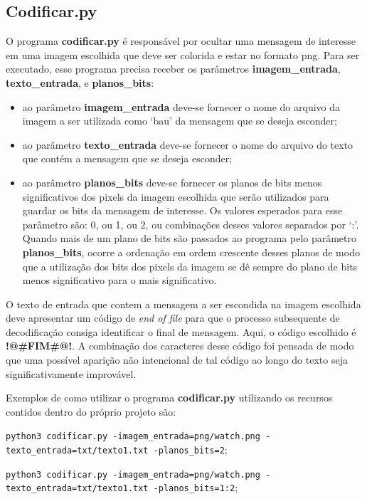 \documentclass{article}
\begin{document}
%
\subsection{Codificar.py}
O programa \textbf{codificar.py} é responsável por ocultar uma mensagem de interesse em uma imagem escolhida que deve ser colorida e estar no formato png. Para ser executado, esse programa precisa receber os parâmetros \textbf{imagem\_entrada}, \textbf{texto\_entrada}, e \textbf{planos\_bits}:

\begin{itemize}
	\item ao parâmetro \textbf{imagem\_entrada} deve-se fornecer o nome do arquivo da imagem a ser utilizada como `bau' da mensagem que se deseja esconder;
	\item ao parâmetro \textbf{texto\_entrada} deve-se fornecer o nome do arquivo do texto que contém a mensagem que
	se deseja esconder;
	\item ao parâmetro \textbf{planos\_bits} deve-se fornecer os planos de bits menos significativos dos pixels da imagem escolhida que serão utilizados para guardar os bits da mensagem de interesse. Os valores esperados para esse parâmetro são: 0, ou 1, ou 2, ou combinações desses valores separados por ‘:’. Quando mais de um plano de bits são passados ao programa pelo parâmetro \textbf{planos\_bits}, ocorre a ordenação em ordem crescente desses planos de modo que a utilização dos bits dos pixels da imagem se dê sempre do plano de bits menos significativo para o mais significativo.
\end{itemize}

\noindent
O texto de entrada que contem a mensagem a ser escondida na imagem escolhida deve apresentar um código de \textit{end of file} para que o processo subsequente de decodificação consiga identificar o final de mensagem. Aqui, o código escolhido é \textbf{!@\#FIM\#@!}. A combinação dos caracteres desse código foi pensada de modo que uma possível aparição não intencional de tal código ao longo do texto seja significativamente improvável.

Exemplos de como utilizar o programa \textbf{codificar.py} utilizando os recursos contidos dentro do próprio projeto são:

\lstinline{python3 codificar.py -imagem_entrada=png/watch.png -texto_entrada=txt/texto1.txt -planos_bits=2};

\lstinline{python3 codificar.py -imagem_entrada=png/watch.png -texto_entrada=txt/texto1.txt -planos_bits=1:2};
\end{document}
